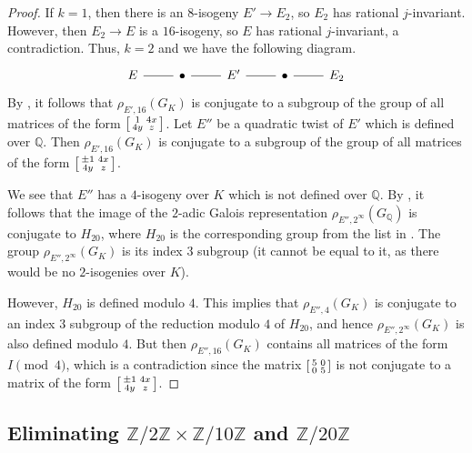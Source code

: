 \documentclass[10pt,leqno]{amsart}
\newcommand\sm[1]{\begin{bsmallmatrix}#1\end{bsmallmatrix}}
\newcommand{\Z}{\mathbb{Z}}
\newcommand{\Q}{\mathbb{Q}}
\theoremstyle{definition}
\theoremstyle{remark}
\numberwithin{theorem}{section}
\begin{document}
\begin{proof}
    If $k=1$, then there is an $8$-isogeny $E' \to E_2$, so $E_2$ has rational $j$-invariant. However, then $E_2 \to E$ is a $16$-isogeny, so $E$ has rational $j$-invariant, a contradiction. Thus, $k=2$ and we have the following diagram.
    \[\begin{tikzcd}
	E & \bullet & {E'} & \bullet & {E_2}
	\arrow[no head, from=1-1, to=1-2]
	\arrow[no head, from=1-2, to=1-3]
	\arrow[no head, from=1-3, to=1-4]
	\arrow[no head, from=1-4, to=1-5]
\end{tikzcd}\]
By , it follows that $\rho_{E', 16}(G_K)$ is conjugate to a subgroup of the group of all matrices of the form $\sm{1 & 4x \\ 4y & z}$. Let $E''$  be a quadratic twist of $E'$ which is defined over $\Q$. Then $\rho_{E', 16}(G_K)$ is conjugate to a subgroup of the group of all matrices of the form $\sm{\pm 1 & 4x \\ 4y & z}$.

We see that  $E''$ has a $4$-isogeny over $K$ which is not defined over $\Q$. By \cite[Proposition 3.2]{ja}, it follows that the image of the $2$-adic Galois representation $\rho_{E'', 2^\infty}(G_\Q)$ is conjugate to $H_{20}$, where $H_{20}$ is the corresponding group from the list in \cite{rouse-zureickbrown-2adic}. The group $\rho_{E'', 2^\infty}(G_K)$ is its index $3$ subgroup (it cannot be equal to it, as there would be no $2$-isogenies over $K$). 

However, $H_{20}$ is defined modulo $4$. This implies that $\rho_{E'', 4}(G_K)$ is conjugate to an index $3$ subgroup of the reduction modulo $4$ of $H_{20}$, and hence $\rho_{E'', 2^{\infty}}(G_K)$ is also defined modulo $4$. But then $\rho_{E'', 16}(G_K)$ contains all matrices of the form $I \pmod 4$, which is a contradiction since the matrix $\sm{5 & 0 \\ 0 & 5}$ is not conjugate to a matrix of the form $\sm{\pm 1 & 4x \\ 4y & z}$.
\end{proof}  
\subsection{Eliminating $\Z/2\Z \times \Z/10\Z$ and $\Z/20\Z$}
\end{document}
